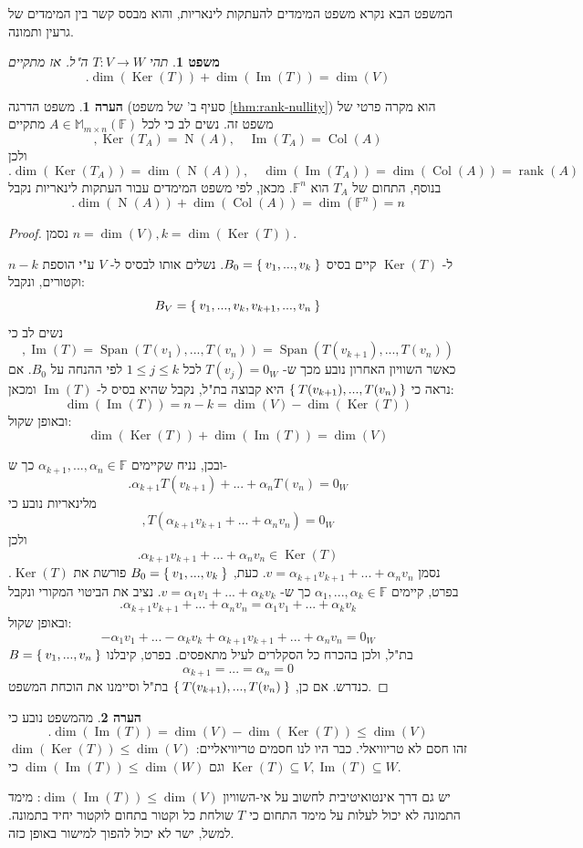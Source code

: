 \documentclass[12pt]{report}
\theoremstyle{plain}
\newtheorem{theorem}{משפט}[chapter]
\theoremstyle{definition}
\newtheorem{remark}{הערה}[chapter]
\newcommand{\F}{\mathbb{F}}
\DeclareMathOperator{\rank}{rank}
\newcommand{\M}{\mathbb{M}}
\newcommand{\0}{\mathbf{0}}
\DeclareMathOperator{\Span}{Span}
\DeclareMathOperator{\Col}{Col}
\DeclareMathOperator{\Null}{N}
\DeclareMathOperator{\Ker}{Ker}
\DeclareMathOperator{\Image}{Im}
\begin{document}
המשפט הבא נקרא משפט המימדים להעתקות לינאריות, והוא מבסס קשר בין המימדים של גרעין ותמונה.

\begin{theorem}\label{thm:ker-image}
תהי
$T:V\to W$
ה"ל. אז מתקיים
$$
.\dim(\Ker(T))+\dim(\Image(T))=\dim(V)
$$
\end{theorem}

\begin{remark}
משפט הדרגה (סעיף ב' של משפט
\ref{thm:rank-nullity})
הוא מקרה פרטי של משפט זה. נשים לב כי לכל 
$A\in\M_{m\times n}(\F)$
מתקיים
$$
,\Ker(T_A)=\Null(A),\quad \Image(T_A)=\Col(A) 
$$
ולכן
$$
.\dim(\Ker(T_A))=\dim(\Null(A)),\quad \dim(\Image(T_A))=\dim(\Col(A))=\rank(A) 
$$
בנוסף, התחום של 
$T_A$
הוא 
$\F^n$.
מכאן, לפי משפט המימדים עבור העתקות לינאריות נקבל
$$
.\dim(\Null(A))+\dim(\Col(A))=\dim(\F^n)=n
$$
\end{remark}

\begin{proof}
נסמן
$n=\dim(V),k=\dim(\Ker(T))$.

ל-
$\Ker(T)$
קיים בסיס
$B_0=\Set{v_1,...,v_k}$.
נשלים אותו לבסיס ל-
$V$ 
ע"י הוספת
$n-k$
וקטורים, ונקבל:
$$B_V=\Set{v_1,...,v_k,v_{k+1},...,v_n}$$
נשים לב כי
$$
,\Image(T)=\Span(T(v_1),...,T(v_n))=\Span(T(v_{k+1}),...,T(v_n))
$$
כאשר השוויון האחרון נובע מכך ש-
$T(v_j)=0_W$
לכל 
$1\leq j\leq k$
לפי ההנחה על
$B_0$.
אם נראה כי
$\Set{T(v_{k+1}),...,T(v_n)}$
היא קבוצה בת"ל, נקבל שהיא בסיס ל-
$\Image(T)$
ומכאן:
$$
\dim(\Image(T))=n-k=\dim(V)-\dim(\Ker(T))
$$
ובאופן שקול:
$$
\dim(\Ker(T))+\dim(\Image(T))=\dim(V)
$$

ובכן, נניח שקיימים 
$\alpha_{k+1},...,\alpha_n\in\F$
כך ש-
$$
.\alpha_{k+1}T(v_{k+1})+...+\alpha_nT(v_n)=0_W
$$
מלינאריות נובע כי
$$
,T(\alpha_{k+1}v_{k+1}+...+\alpha_nv_n)=0_W
$$
ולכן
$$
.\alpha_{k+1}v_{k+1}+...+\alpha_nv_n\in\Ker(T)
$$
נסמן 
$v=\alpha_{k+1}v_{k+1}+...+\alpha_nv_n$.
כעת,
$B_0=\Set{v_1,...,v_k}$
פורשת את
$\Ker(T)$.
בפרט, קיימים 
$\alpha_1,...,\alpha_k\in\F$
כך ש-
$v=\alpha_1v_1+...+\alpha_kv_k$.
נציב את הביטוי המקורי ונקבל
$$
.\alpha_{k+1}v_{k+1}+...+\alpha_nv_n=\alpha_1v_1+...+\alpha_kv_k
$$
ובאופן שקול:
$$
-\alpha_1v_1+...-\alpha_kv_k+\alpha_{k+1}v_{k+1}+...+\alpha_nv_n=0_W
$$
$B=\Set{v_1,...,v_n}$
בת"ל, ולכן בהכרח כל הסקלרים לעיל מתאפסים. בפרט, קיבלנו
$$\alpha_{k+1}=...=\alpha_n=0$$
כנדרש. אם כן, 
$\Set{T(v_{k+1}),...,T(v_n)}$
בת"ל וסיימנו את הוכחת המשפט.
\end{proof}

\begin{remark}
מהמשפט נובע כי
$$
.\dim(\Image(T))=\dim(V)-\dim(\Ker(T))\leq\dim(V)
$$
זהו חסם לא טריוויאלי. כבר היו לנו חסמים טריוויאליים:
$\dim(\Ker(T))\leq\dim(V)$
וגם
$\dim(\Image(T))\leq\dim(W)$
כי
$\Ker(T)\subseteq V,\Image(T)\subseteq W$.

יש גם דרך אינטואיטיבית לחשוב על אי-השוויון
$\dim(\Image(T))\leq\dim(V)$:
מימד התמונה לא יכול לעלות על מימד התחום כי 
$T$
שולחת כל וקטור בתחום לוקטור יחיד בתמונה. למשל, ישר לא יכול להפוך למישור באופן כזה.
\end{remark}
\end{document}
